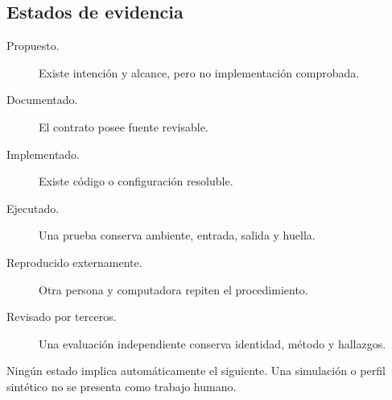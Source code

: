 \documentclass[11pt,letterpaper]{article}
\begin{document}
\subsection{Estados de evidencia}
\begin{description}
\item[Propuesto.] Existe intención y alcance, pero no implementación comprobada.
\item[Documentado.] El contrato posee fuente revisable.
\item[Implementado.] Existe código o configuración resoluble.
\item[Ejecutado.] Una prueba conserva ambiente, entrada, salida y huella.
\item[Reproducido externamente.] Otra persona y computadora repiten el procedimiento.
\item[Revisado por terceros.] Una evaluación independiente conserva identidad, método y hallazgos.
\end{description}
Ningún estado implica automáticamente el siguiente. Una simulación o perfil sintético no
se presenta como trabajo humano.
\end{document}
